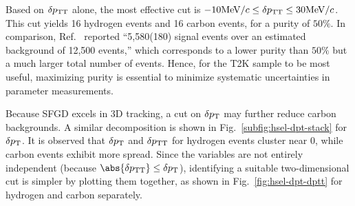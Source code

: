      Based on $\delta p_\textrm{TT}$ alone, the most effective cut is $-10\textrm{MeV}/c \leq \delta p_\textrm{TT} \leq 30\textrm{MeV}/c$.
     This cut yields 16 hydrogen events and 16 carbon events, for a purity of $50\%$.
     In comparison, Ref.~\cite{MINERvA:2023avz} reported ``5,580(180) signal events over an estimated background of 12,500 events,'' which corresponds to a lower purity than $50\%$ but a much larger total number of events.
     Hence, for the T2K sample to be most useful, maximizing purity is essential to minimize systematic uncertainties in parameter measurements.

     Because SFGD excels in 3D tracking, a cut on $\delta p_\textrm{T}$ may further reduce carbon backgrounds.
     A similar decomposition is shown in Fig.~\ref{subfig:hsel-dpt-stack} for $\delta p_\textrm{T}$.
     It is observed that $\delta p_\textrm{T}$ and $\delta p_\textrm{TT}$ for hydrogen events cluster near $0$, while carbon events exhibit more spread.
     Since the variables are not entirely independent (because $\abs{\dptt} \leq \dpt$), identifying a suitable two-dimensional cut is simpler by plotting them together, as shown in Fig.~\ref{fig:hsel-dpt-dptt} for hydrogen and carbon separately.
